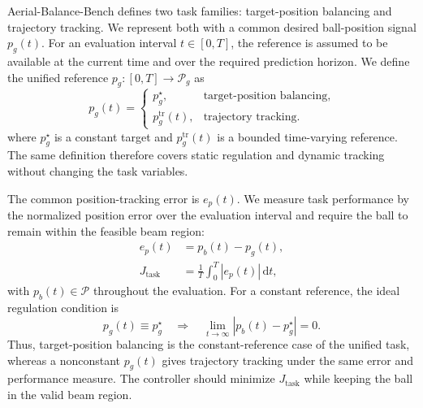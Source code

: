 \documentclass[letterpaper, 10 pt, conference]{ieeeconf}  %
\begin{document}
Aerial-Balance-Bench defines two task families: target-position balancing and trajectory tracking. We represent both 
with a common desired ball-position signal \(p_g(t)\). For an evaluation interval $t\in[0,T]$, the reference is assumed 
to be available at the current time and over the required prediction horizon. We define the unified reference
$p_g\colon[0,T]\rightarrow\mathcal{P}_g$ as
\begin{equation}
    p_g(t)=
    \begin{cases}
        p_g^\star, & \text{target-position balancing},\\
        p_g^{\mathrm{tr}}(t), & \text{trajectory tracking}.
    \end{cases}
    \label{eq:unified_position_reference}
\end{equation}
where $p_g^\star$ is a constant target and $p_g^{\mathrm{tr}}(t)$ is a bounded time-varying reference. The same
definition therefore covers static regulation and dynamic tracking without changing the task variables.

The common position-tracking error is $e_p(t)$. We measure task performance by the normalized
position error over the evaluation interval and require the ball to remain within the feasible beam region:
\begin{equation}
\begin{aligned}
    e_p(t) &= p_b(t)-p_g(t),\\
    J_{\mathrm{task}}
    &=\frac{1}{T}\int_{0}^{T}|e_p(t)|\,\mathrm{d}t,
\end{aligned}
    \label{eq:unified_task_objective}
\end{equation}
with $p_b(t)\in\mathcal{P}$ throughout the evaluation. For a constant reference, the ideal regulation condition
is
\begin{equation}
    p_g(t)\equiv p_g^\star
    \quad\Longrightarrow\quad
    \lim_{t\rightarrow\infty}|p_b(t)-p_g^\star|=0.
    \label{eq:balancing_special_case}
\end{equation}
Thus, target-position balancing is the constant-reference case of the unified task, whereas a nonconstant
$p_g(t)$ gives trajectory tracking under the same error and performance measure. The controller should minimize
$J_{\mathrm{task}}$ while keeping the ball in the valid beam region.
\end{document}
